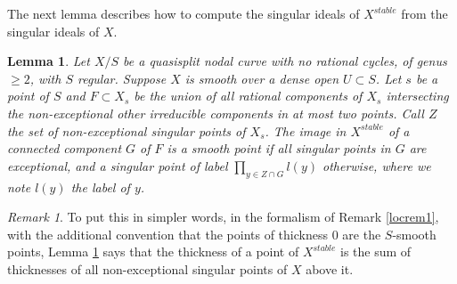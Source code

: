 \documentclass[a4paper,12pt]{amsart} %
\numberwithin{equation}{subsection}
\theoremstyle{definition}
\theoremstyle{plain}%
\newtheorem{lemma}[definition]{Lemma}
\theoremstyle{remark}
\newtheorem{remark}[definition]{Remark}
\begin{document}
The next lemma describes how to compute the singular ideals of $X^{stable}$ from the singular ideals of $X$.


\begin{lemma}\label{lemma stable model and merging of singularities}
Let $X/S$ be a quasisplit nodal curve with no rational cycles, of genus $\geq 2$, with $S$ regular. Suppose $X$ is smooth over a dense open $U\subset S$. Let $s$ be a point of $S$ and $F\subset X_s$ be the union of all rational components of $X_s$ intersecting the non-exceptional other irreducible components in at most two points. Call $Z$ the set of non-exceptional singular points of $X_s$. The image in $X^{stable}$ of a connected component $G$ of $F$ is a smooth point if all singular points in $G$ are exceptional, and a singular point of label $\prod\limits_{y\in Z\cap G}l(y)$ otherwise, where we note $l(y)$ the label of $y$.
\end{lemma}

\begin{remark}
To put this in simpler words, in the formalism of Remark \ref{locrem1}, with the additional convention that the points of thickness $0$ are the $S$-smooth points, Lemma \ref{lemma stable model and merging of singularities} says that the thickness of a point of $X^{stable}$ is the sum of thicknesses of all non-exceptional singular points of $X$ above it.
\end{remark}
\end{document}
